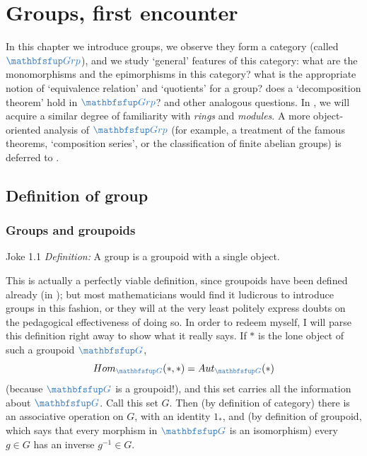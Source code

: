 \chapter{Groups, first encounter}%
\label{chap:groups}

In this chapter we introduce groups, we observe they form a category
(called $\categ{Grp}$), and we study `general' features of this
category: what are the monomorphisms and the epimorphisms in this
category? what is the appropriate notion of `equivalence relation' and
`quotients' for a group? does a `decomposition theorem' hold in
$\categ{Grp}$? and other analogous questions.  In
, we will acquire a similar degree of familiarity
with \emph{rings} and \emph{modules}. A more object-oriented analysis
of $\categ{Grp}$ (for example, a treatment of the famous 
theorems, `composition series', or the classification of finite
abelian groups) is deferred to .

\section{Definition of group}%
\label{sec:groups:definition-of-group}


\subsection{Groups and groupoids}%
\label{subsec:groups:groups-and-groupoids}

\begin{exam}{Joke 1.1}{}
  \emph{Definition:} A group is a groupoid with a single object.
\end{exam}

This is actually a perfectly viable definition, since groupoids have
been defined already (in ); but most
mathematicians would find it ludicrous to introduce groups in this
fashion, or they will at the very least politely express doubts on the
pedagogical effectiveness of doing so. In order to redeem myself, I
will parse this definition right away to show what it really says. If
$*$ is the lone object of such a groupoid $\categ{G}$,
\[
  \Hom_{\categ{G}}(*,*) = \Aut_{\categ{G}}(*)
\]
(because $\categ{G}$ is a groupoid!), and this set carries all the
information about $\categ{G}$. Call this set $G$. Then (by definition
of category) there is an associative operation on $G$, with an
identity $1_*$, and (by definition of groupoid, which says that every
morphism in $\categ{G}$ is an isomorphism) every $g \in G$ has an
inverse $g^{-1} \in G$.

